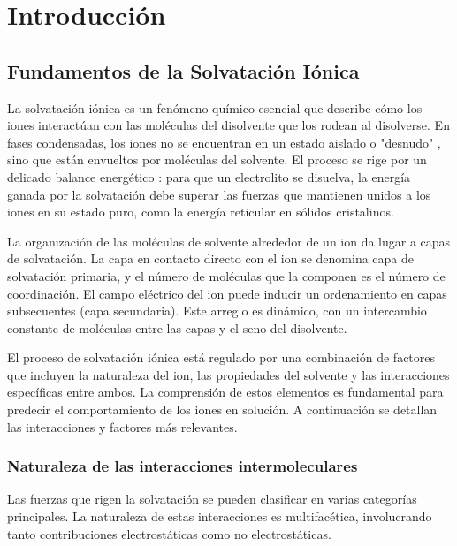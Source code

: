 \chapter{Introducción}


\section{Fundamentos de la Solvatación Iónica}

La solvatación iónica es un fenómeno químico esencial que describe cómo los iones interactúan con las moléculas del disolvente que los rodean al disolverse. En fases condensadas, los iones no se encuentran en un estado aislado o "desnudo" , sino que están envueltos por moléculas del solvente. El proceso se rige por un delicado balance energético : para que un electrolito se disuelva, la energía ganada por la solvatación debe superar las fuerzas que mantienen unidos a los iones en su estado puro, como la energía reticular en sólidos cristalinos.

La organización de las moléculas de solvente alrededor de un ion da lugar a capas de solvatación. La capa en contacto directo con el ion se denomina capa de solvatación primaria, y el número de moléculas que la componen es el número de coordinación. El campo eléctrico del ion puede inducir un ordenamiento en capas subsecuentes (capa secundaria). Este arreglo es dinámico, con un intercambio constante de moléculas entre las capas y el seno del disolvente.

El proceso de solvatación iónica está regulado por una combinación de factores que incluyen la naturaleza del ion, las propiedades del solvente y las interacciones específicas entre ambos. La comprensión de estos elementos es fundamental para predecir el comportamiento de los iones en solución. A continuación se detallan las interacciones y factores más relevantes.

\subsection{Naturaleza de las interacciones intermoleculares}
Las fuerzas que rigen la solvatación se pueden clasificar en varias categorías principales. La naturaleza de estas interacciones es multifacética, involucrando tanto contribuciones electrostáticas como no electrostáticas.

